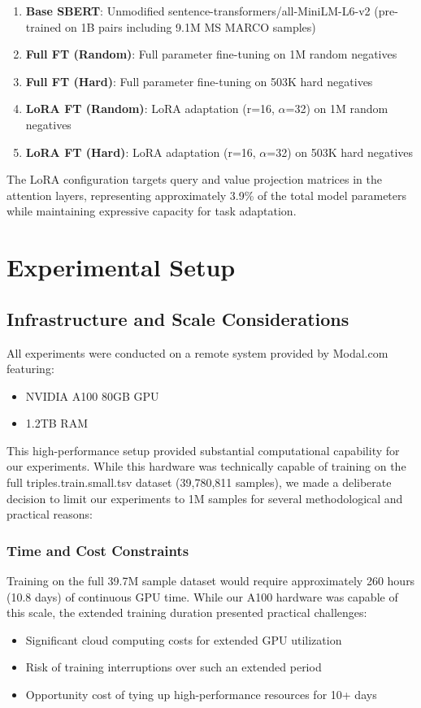 \documentclass[conference]{IEEEtran}
\begin{document}
\begin{enumerate}
\item \textbf{Base SBERT}: Unmodified sentence-transformers/all-MiniLM-L6-v2 (pre-trained on 1B pairs including 9.1M MS MARCO samples)
\item \textbf{Full FT (Random)}: Full parameter fine-tuning on 1M random negatives
\item \textbf{Full FT (Hard)}: Full parameter fine-tuning on 503K hard negatives
\item \textbf{LoRA FT (Random)}: LoRA adaptation (r=16, $\alpha$=32) on 1M random negatives
\item \textbf{LoRA FT (Hard)}: LoRA adaptation (r=16, $\alpha$=32) on 503K hard negatives
\end{enumerate}

The LoRA configuration targets query and value projection matrices in the attention layers, representing approximately 3.9\% of the total model parameters while maintaining expressive capacity for task adaptation.

\section{Experimental Setup}
\subsection{Infrastructure and Scale Considerations}
All experiments were conducted on a remote system provided by Modal.com \cite{modal2023} featuring:
\begin{itemize}
\item NVIDIA A100 80GB GPU
\item 1.2TB RAM
\end{itemize}

This high-performance setup provided substantial computational capability for our experiments. While this hardware was technically capable of training on the full triples.train.small.tsv dataset (39,780,811 samples), we made a deliberate decision to limit our experiments to 1M samples for several methodological and practical reasons:

\subsubsection{Time and Cost Constraints}
Training on the full 39.7M sample dataset would require approximately 260 hours (10.8 days) of continuous GPU time. While our A100 hardware was capable of this scale, the extended training duration presented practical challenges:
\begin{itemize}
\item Significant cloud computing costs for extended GPU utilization
\item Risk of training interruptions over such an extended period
\item Opportunity cost of tying up high-performance resources for 10+ days
\end{itemize}
\end{document}

